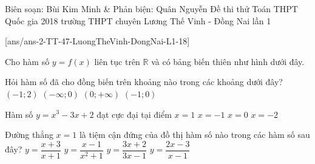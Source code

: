 
\begin{name}
{Biên soạn: Bùi Kim Minh \& Phản biện: Quân Nguyễn}
{Đề thi thử Toán THPT Quốc gia 2018 trường THPT chuyên Lương Thế Vinh - Đồng Nai lần 1}
\end{name}
\setcounter{ex}{0}\setcounter{bt}{0}
[ans/ans-2-TT-47-LuongTheVinh-DongNai-L1-18]

\begin{ex}%
	Cho hàm số $y=f(x)$ liên tục trên $\mathbb{R}$ và có bảng biến thiên như hình dưới đây.
	\begin{center}
	\end{center}
	Hỏi hàm số đã cho đồng biến trên khoảng nào trong các khoảng dưới đây?
	\choice
	{$(-1;2)$}
	{$(-\infty;0)$}
	{$(0;+\infty)$}
	{\True $(-1;0)$}
\end{ex}

\begin{ex}%
	Hàm số $y=x^3-3x+2$ đạt cực đại tại điểm
	\choice
	{$x=1$}
	{\True $x=-1$}
	{$x=0$}
	{$x=-2$}
\end{ex}

\begin{ex}%
	Đường thẳng $x=1$ là tiệm cận đứng của đồ thị hàm số nào trong các hàm số sau đây?
	\choice
	{ $y=\dfrac{x+3}{x+1}$}	
	{ $y=\dfrac{x-1}{x^2+1}$}	
	{$y=\dfrac{3x+2}{3x-1}$}	
	{\True $y=\dfrac{2x-3}{x-1}$}
\end{ex}

